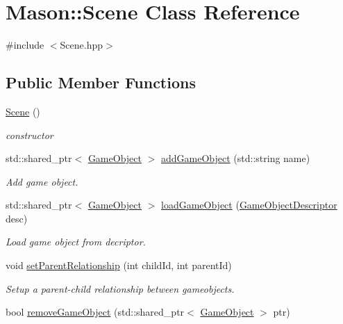 \hypertarget{class_mason_1_1_scene}{}\section{Mason\+:\+:Scene Class Reference}
\label{class_mason_1_1_scene}


{\ttfamily \#include $<$Scene.\+hpp$>$}

\subsection*{Public Member Functions}
\begin{DoxyCompactItemize}
\item 
\hyperlink{class_mason_1_1_scene_ad10176d75a9cc0da56626f682d083507}{Scene} ()
\begin{DoxyCompactList}\small\item\em constructor \end{DoxyCompactList}\item 
std\+::shared\+\_\+ptr$<$ \hyperlink{class_mason_1_1_game_object}{Game\+Object} $>$ \hyperlink{class_mason_1_1_scene_afe8ac9cb371c04a0587faf06bf828ac9}{add\+Game\+Object} (std\+::string name)
\begin{DoxyCompactList}\small\item\em Add game object. \end{DoxyCompactList}\item 
std\+::shared\+\_\+ptr$<$ \hyperlink{class_mason_1_1_game_object}{Game\+Object} $>$ \hyperlink{class_mason_1_1_scene_a4d1afc4d112079aedd3829a8a42e902e}{load\+Game\+Object} (\hyperlink{class_mason_1_1_game_object_descriptor}{Game\+Object\+Descriptor} desc)
\begin{DoxyCompactList}\small\item\em Load game object from decriptor. \end{DoxyCompactList}\item 
void \hyperlink{class_mason_1_1_scene_a2d10aca9d364dc70935795a1436f353d}{set\+Parent\+Relationship} (int child\+Id, int parent\+Id)
\begin{DoxyCompactList}\small\item\em Setup a parent-\/child relationship between gameobjects. \end{DoxyCompactList}\item 
bool \hyperlink{class_mason_1_1_scene_aad5427fcdd330f65dc4e7b1e627afce4}{remove\+Game\+Object} (std\+::shared\+\_\+ptr$<$ \hyperlink{class_mason_1_1_game_object}{Game\+Object} $>$ ptr)

\end{DoxyCompactItemize}
